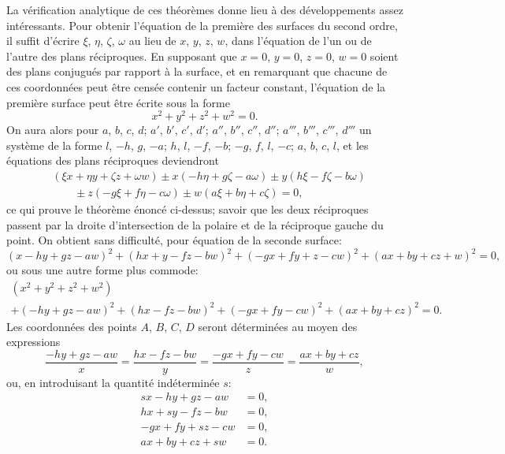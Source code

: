\documentclass[11pt,a4paper]{article}
\theoremstyle{definition}
\begin{document}
La v\'{e}rification analytique de ces th\'{e}or\`{e}mes donne lieu \`{a} des d\'{e}veloppements assez int\'{e}ressants. Pour obtenir l'\'{e}quation de la premi\`{e}re des surfaces du second ordre, il suffit d'\'{e}crire $\xi$, $\eta$, $\zeta$, $\omega$ au lieu de $x$, $y$, $z$, $w$, dans l'\'{e}quation de l'un ou de l'autre des plans r\'{e}ciproques. En supposant que $x=0$, $y=0$, $z=0$, $w=0$ soient des plans conjugu\'{e}s par rapport \`{a} la surface, et en remarquant que chacune de ces coordonn\'{e}es peut \^{e}tre cens\'{e}e contenir un facteur constant, l'\'{e}quation de la premi\`{e}re surface peut \^{e}tre \'{e}crite sous la forme
\[
x^{2} + y^{2} + z^{2} + w^{2} = 0.
\]
On aura alors pour $a$, $b$, $c$, $d$; $a'$, $b'$, $c'$, $d'$; $a''$, $b''$, $c''$, $d''$; $a'''$, $b'''$, $c'''$, $d'''$ un syst\`{e}me de la forme $l$, $-h$, $g$, $-a$; $h$, $l$, $-f$, $-b$; $-g$, $f$, $l$, $-c$; $a$, $b$, $c$, $l$, et les \'{e}quations des plans r\'{e}ciproques deviendront
\begin{align*}
&(\xi x + \eta y + \zeta z + \omega w) \pm x(-h\eta + g\zeta - a\omega) \pm y(h\xi - f\zeta - b\omega) \\
&\qquad \pm z(-g\xi + f\eta - c\omega) \pm w(a\xi + b\eta + c\zeta) = 0,
\end{align*}
ce qui prouve le th\'{e}or\`{e}me \'{e}nonc\'{e} ci-dessus; savoir que les deux r\'{e}ciproques passent par la droite d'intersection de la polaire et de la r\'{e}ciproque gauche du point. On obtient sans difficult\'{e}, pour \'{e}quation de la seconde surface:
\[
(x - hy + gz - aw)^{2} + (hx + y - fz - bw)^{2} + (-gx + fy + z - cw)^{2} + (ax + by + cz + w)^{2} = 0,
\]
ou sous une autre forme plus commode:
\begin{multline*}
(x^{2} + y^{2} + z^{2} + w^{2}) \\
+ (-hy + gz - aw)^{2} + (hx - fz - bw)^{2} + (-gx + fy - cw)^{2} + (ax + by + cz)^{2} = 0.
\end{multline*}
Les coordonn\'{e}es des points $A$, $B$, $C$, $D$ seront d\'{e}termin\'{e}es au moyen des expressions
\[
\frac{-hy + gz - aw}{x} = \frac{hx - fz - bw}{y} = \frac{-gx + fy - cw}{z} = \frac{ax + by + cz}{w},
\]
ou, en introduisant la quantit\'{e} ind\'{e}termin\'{e}e $s$:
\begin{align*}
sx - hy + gz - aw &= 0, \\
hx + sy - fz - bw &= 0, \\
-gx + fy + sz - cw &= 0, \\
ax + by + cz + sw &= 0.
\end{align*}
\end{document}
